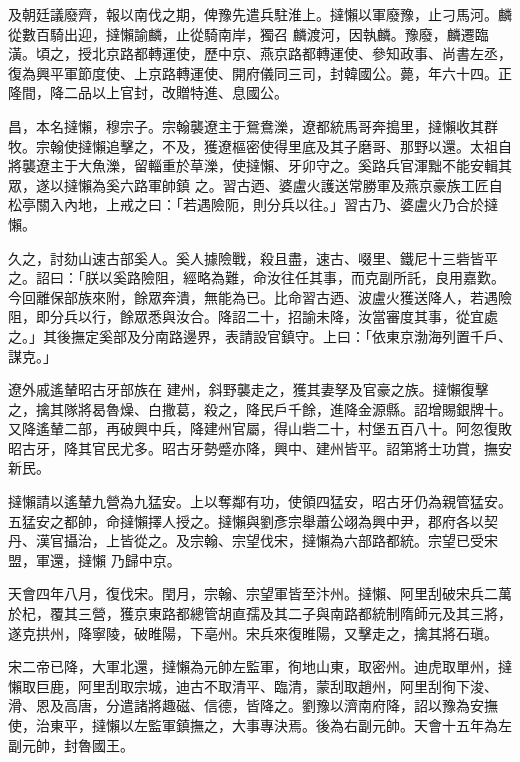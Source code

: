 \begin{pinyinscope}
 及朝廷議廢齊，報以南伐之期，俾豫先遣兵駐淮上。撻懶以軍廢豫，止刁馬河。麟從數百騎出迎，撻懶諭麟，止從騎南岸，獨召
 麟渡河，因執麟。豫廢，麟遷臨潢。頃之，授北京路都轉運使，歷中京、燕京路都轉運使、參知政事、尚書左丞，復為興平軍節度使、上京路轉運使、開府儀同三司，封韓國公。薨，年六十四。正隆間，降二品以上官封，改贈特進、息國公。



 昌，本名撻懶，穆宗子。宗翰襲遼主于鴛鴦濼，遼都統馬哥奔搗里，撻懶收其群牧。宗翰使撻懶追擊之，不及，獲遼樞密使得里底及其子磨哥、那野以還。太祖自將襲遼主于大魚濼，留輜重於草濼，使撻懶、牙卯守之。奚路兵官渾黜不能安輯其眾，遂以撻懶為奚六路軍帥鎮
 之。習古迺、婆盧火護送常勝軍及燕京豪族工匠自松亭關入內地，上戒之曰：「若遇險阨，則分兵以往。」習古乃、婆盧火乃合於撻懶。



 久之，討劾山速古部奚人。奚人據險戰，殺且盡，速古、啜里、鐵尼十三砦皆平之。詔曰：「朕以奚路險阻，經略為難，命汝往任其事，而克副所託，良用嘉歎。今回離保部族來附，餘眾奔潰，無能為已。比命習古迺、波盧火獲送降人，若遇險阻，即分兵以行，餘眾悉與汝合。降詔二十，招諭未降，汝當審度其事，從宜處之。」其後撫定奚部及分南路邊界，表請設官鎮守。上曰：「依東京渤海列置千戶、謀克。」



 遼外戚遙輦昭古牙部族在
 建州，斜野襲走之，獲其妻孥及官豪之族。撻懶復擊之，擒其隊將曷魯燥、白撒葛，殺之，降民戶千餘，進降金源縣。詔增賜銀牌十。又降遙輦二部，再破興中兵，降建州官屬，得山砦二十，村堡五百八十。阿忽復敗昭古牙，降其官民尤多。昭古牙勢蹙亦降，興中、建州皆平。詔第將士功賞，撫安新民。



 撻懶請以遙輦九營為九猛安。上以奪鄰有功，使領四猛安，昭古牙仍為親管猛安。五猛安之都帥，命撻懶擇人授之。撻懶與劉彥宗舉蕭公翊為興中尹，郡府各以契丹、漢官攝治，上皆從之。及宗翰、宗望伐宋，撻懶為六部路都統。宗望已受宋盟，軍還，撻懶
 乃歸中京。



 天會四年八月，復伐宋。閏月，宗翰、宗望軍皆至汴州。撻懶、阿里刮破宋兵二萬於杞，覆其三營，獲京東路都總管胡直孺及其二子與南路都統制隋師元及其三將，遂克拱州，降寧陵，破睢陽，下亳州。宋兵來復睢陽，又擊走之，擒其將石瑱。



 宋二帝已降，大軍北還，撻懶為元帥左監軍，徇地山東，取密州。迪虎取單州，撻懶取巨鹿，阿里刮取宗城，迪古不取清平、臨清，蒙刮取趙州，阿里刮徇下浚、滑、恩及高唐，分遣諸將趣磁、信德，皆降之。劉豫以濟南府降，詔以豫為安撫使，治東平，撻懶以左監軍鎮撫之，大事專決焉。後為右副元帥。天會十五年為左
 副元帥，封魯國王。




\end{pinyinscope}
